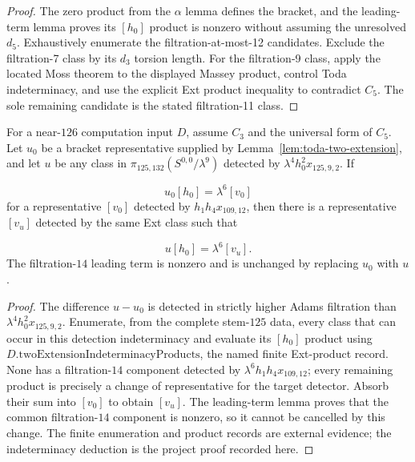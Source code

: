 \begin{proof}
  The zero product from the $\alpha$ lemma defines the bracket, and the
  leading-term lemma proves its $[h_0]$ product is nonzero without assuming the
  unresolved $d_5$.  Exhaustively enumerate the filtration-at-most-12
  candidates.  Exclude the filtration-7 class by its $d_3$ torsion length.
  For the filtration-9 class, apply the located Moss theorem to the displayed
  Massey product, control Toda indeterminacy, and use the explicit Ext product
  inequality to contradict $C_5$.  The sole remaining candidate is the stated
  filtration-11 class.
\end{proof}

\begin{lemma}
  \label{lem:near126-two-extension-indeterminacy}
  \notready
  For a near-$126$ computation input $D$, assume $C_3$ and the universal form
  of $C_5$.  Let $u_0$ be a bracket
  representative supplied by Lemma~\ref{lem:toda-two-extension}, and let $u$
  be any class in $\pi_{125,132}(S^{0,0}/\lambda^9)$ detected by
  $\lambda^4h_0^2x_{125,9,2}$.  If

  \[
    u_0[h_0]=\lambda^6[v_0]
  \]
  for a representative $[v_0]$ detected by $h_1h_4x_{109,12}$, then there is
  a representative $[v_u]$ detected by the same Ext class such that

  \[
    u[h_0]=\lambda^6[v_u].
  \]
  The filtration-$14$ leading term is nonzero and is unchanged by replacing
  $u_0$ with $u$.
\end{lemma}

\begin{proof}
  The difference $u-u_0$ is detected in strictly higher Adams filtration than
  $\lambda^4h_0^2x_{125,9,2}$.  Enumerate, from the complete stem-$125$ data,
  every class that can occur in this detection indeterminacy and evaluate its
  $[h_0]$ product using $D.\mathrm{twoExtensionIndeterminacyProducts}$, the
  named finite Ext-product record.  None has a
  filtration-$14$ component detected by
  $\lambda^6h_1h_4x_{109,12}$; every remaining product is precisely a change
  of representative for the target detector.  Absorb their sum into $[v_0]$
  to obtain $[v_u]$.  The leading-term lemma proves that the common
  filtration-$14$ component is nonzero, so it cannot be cancelled by this
  change.  The finite enumeration and product records are external evidence;
  the indeterminacy deduction is the project proof recorded here.
\end{proof}

